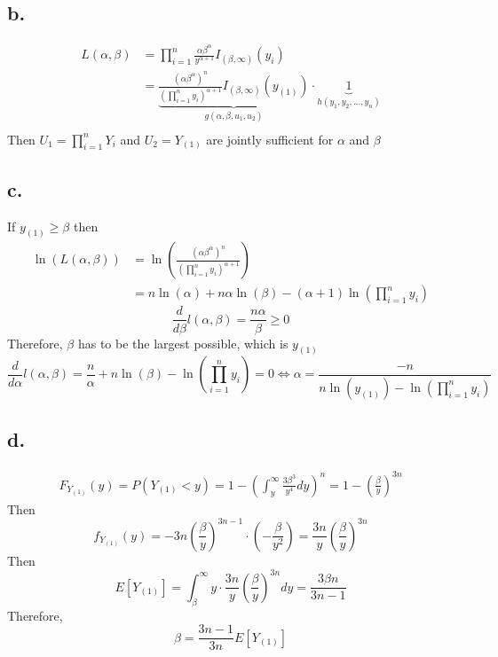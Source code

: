 \documentclass[11pt]{article}
\begin{document}
\subsection*{b.}
\begin{equation*}
    \begin{aligned}
        L(\alpha, \beta) &= \prod_{i=1}^n \frac{\alpha \beta^{\alpha}}{y^{\alpha + 1}} I_{(\beta, \infty)}(y_i) \\
        &= \underbrace{\frac{(\alpha \beta^\alpha)^n}{\left(\prod_{i=1}^n y_i \right)^{\alpha+1}}  I_{(\beta, \infty)}(y_{(1)}) }_{g(\alpha, \beta, u_1, u_2)} \cdot \underbrace{1}_{h(y_1, y_2, \ldots, y_n)}\\ 
    \end{aligned}
\end{equation*}
Then $U_1 = \prod_{i=1}^n Y_i$ and $U_2 = Y_{(1)}$ are jointly sufficient for $\alpha$ and $\beta$
\subsection*{c.}
If $y_{(1)} \ge \beta$ then 
\begin{equation*}
    \begin{aligned}
        \ln(L(\alpha, \beta)) 
        &= \ln \left( \frac{(\alpha \beta^\alpha)^n}{\left( \prod_{i=1}^n y_i \right)^{\alpha +1}}\right) \\
        &= n \ln(\alpha) + n\alpha \ln(\beta) - (\alpha + 1) \ln\left(\prod_{i=1}^n y_i \right)
    \end{aligned}
\end{equation*}
\[
    \frac{d}{d\beta} l(\alpha, \beta) = \frac{n\alpha}{\beta} \ge 0 
\]
Therefore, $\beta$ has to be the largest possible, which is $y_{(1)}$
\[
    \frac{d}{d\alpha} l(\alpha, \beta) = \frac{n}{\alpha} + n \ln(\beta) - \ln \left( \prod_{i=1}^n y_i \right) = 0 \iff \alpha = \frac{-n}{n \ln(y_{(1)}) - \ln\left(\prod_{i=1}^n y_i \right)}  
\]
\subsection*{d.}
\begin{equation*}
    \begin{aligned}
        F_{Y_{(1)}}(y) = P(Y_{(1)} < y) = 1- \left(\int_y^\infty \frac{3\beta^3}{y^4} dy \right)^n = 1- \left(\frac{\beta}{y}\right)^{3n}
    \end{aligned}
\end{equation*}
Then 
\[
    f_{Y_{(1)}}(y) = -3n\left(\frac{\beta}{y}\right)^{3n-1} \cdot \left(-\frac{\beta}{y^2}\right) = \frac{3n}{y} \left(\frac{\beta}{y}\right)^{3n}
\]
Then 
\[
    E[Y_{(1)}] =  \int_\beta^\infty y \cdot \frac{3n}{y} \left(\frac{\beta}{y}\right)^{3n} dy = \dfrac{3{\beta}n}{3n-1}
\]
Therefore, 
\[
    \beta = \frac{3n-1}{3n}E[Y_{(1)}]    
\]
\pagebreak
\end{document}
